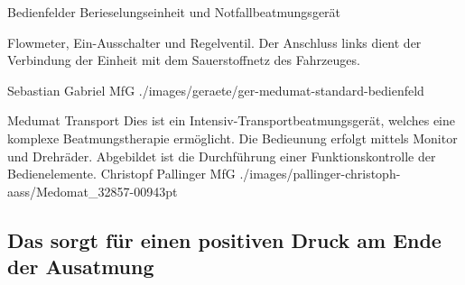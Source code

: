 
\PictureWide
{Bedienfelder Berieselungseinheit 
und Notfallbeatmungsgerät }
{
 Flowmeter, Ein-Ausschalter und
Regelventil. Der Anschluss links dient der Verbindung der
Einheit mit dem Sauerstoffnetz des Fahrzeuges.

 }
{}
{Sebastian Gabriel}
{MfG}
{./images/geraete/ger-medumat-standard-bedienfeld}
{}
{}

\Picture
{Medumat Transport{\texttrademark}}%
{Dies ist ein Intensiv-Transportbeatmungsgerät, 
welches eine komplexe Beatmungstherapie ermöglicht.
Die Bedieunung erfolgt mittels Monitor und Drehräder. 
Abgebildet ist die Durchführung 
einer Funktionskontrolle der Bedienelemente.}%
{}%
{Christopf Pallinger}%
{MfG}%
{./images/pallinger-christoph-aass/Medomat_32857-00943pt}%
{}%
{}%

\subsection{Das  sorgt für einen positiven Druck am Ende der Ausatmung}




